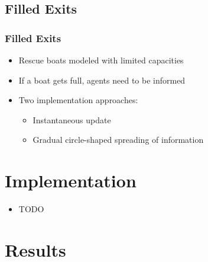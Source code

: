 \documentclass{beamer}
\begin{document}
\subsection{Filled Exits}
\begin{frame}
	\frametitle{Filled Exits}
	\begin{itemize}
		\item Rescue boats modeled with limited capacities
		\item If a boat gets full, agents need to be informed
		\item Two implementation approaches:
			\begin{itemize}
				\item Instantaneous update
				\item Gradual circle-shaped spreading of information
			\end{itemize}
	\end{itemize}
\end{frame}

\section{Implementation}

\begin{frame}
	\begin{itemize}
		\item TODO
	\end{itemize}
\end{frame}

\section{Results}
\end{document}
